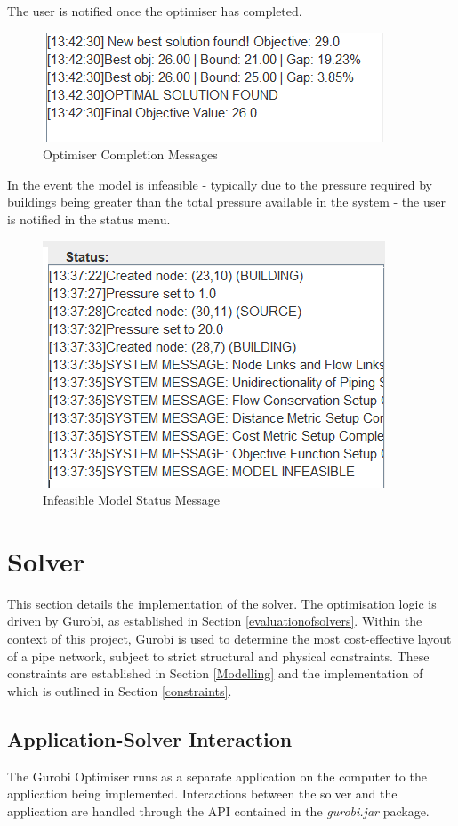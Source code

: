 The user is notified once the optimiser has completed.

\begin{figure}[H]
    \centering
    \includegraphics[width=0.5\linewidth]{optimisercompletion.png}
    \caption{Optimiser Completion Messages}
    \label{fig:optimisercompletion}
\end{figure}

In the event the model is infeasible - typically due to the pressure required by buildings being greater than the total pressure available in the system - the user is notified in the status menu.

\begin{figure}[H]
    \centering
    \includegraphics[width=0.5\linewidth]{infeasiblemodelerror.png}
    \caption{Infeasible Model Status Message}
    \label{fig:infeasiblemodelerror}
\end{figure}


\section{Solver}\label{solver}
This section details the implementation of the solver. The optimisation logic is driven by Gurobi, as established in Section \ref{evaluationofsolvers}. Within the context of this project, Gurobi is used to determine the most cost-effective layout of a pipe network, subject to strict structural and physical constraints. These constraints are established in Section \ref{Modelling} and the implementation of which is outlined in Section \ref{constraints}.

\subsection{Application-Solver Interaction}
The Gurobi Optimiser runs as a separate application on the computer to the application being implemented. Interactions between the solver and the application are handled through the API contained in the \textit{gurobi.jar} package. 


